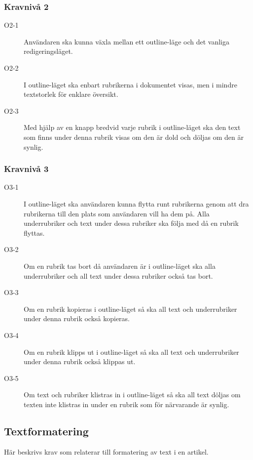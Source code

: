 \subsubsection{Kravnivå 2}
\begin{description}
\item[O2-1] Användaren ska kunna växla mellan ett outline-läge och det vanliga redigeringsläget.
\item[O2-2] I outline-läget ska enbart rubrikerna i dokumentet visas, men i mindre textstorlek för enklare översikt.
\item[O2-3] Med hjälp av en knapp bredvid varje rubrik i outline-läget ska den text som finns under denna rubrik visas om den är dold och döljas om den är synlig.
\end{description}

\subsubsection{Kravnivå 3}
\begin{description}
\item[O3-1] I outline-läget ska användaren kunna flytta runt rubrikerna genom att dra rubrikerna till den plats som användaren vill ha dem på. Alla underrubriker och text under dessa rubriker ska följa med då en rubrik flyttas.
\item[O3-2] Om en rubrik tas bort då användaren är i outline-läget ska alla underrubriker och all text under dessa rubriker också tas bort.
\item[O3-3] Om en rubrik kopieras i outline-läget så ska all text och underrubriker under denna rubrik också kopieras.
\item[O3-4] Om en rubrik klipps ut i outline-läget så ska all text och underrubriker under denna rubrik också klippas ut.
\item[O3-5] Om text och rubriker klistras in i outline-läget så ska all text döljas om texten inte klistras in under en rubrik som för närvarande är synlig.
\end{description}

\subsection{Textformatering}
Här beskrivs krav som relaterar till formatering av text i en artikel.

